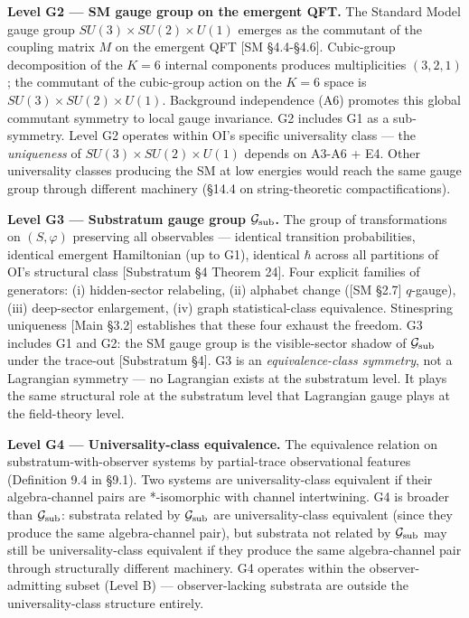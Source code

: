 \documentclass[
]{article}
\begin{document}
\textbf{Level G2 --- SM gauge group on the emergent QFT.} The Standard
Model gauge group \(SU(3) \times SU(2) \times U(1)\) emerges as the
commutant of the coupling matrix \(M\) on the emergent QFT {[}SM
§4.4-§4.6{]}. Cubic-group decomposition of the \(K=6\) internal
components produces multiplicities \((3, 2, 1)\); the commutant of the
cubic-group action on the \(K=6\) space is
\(SU(3) \times SU(2) \times U(1)\). Background independence (A6)
promotes this global commutant symmetry to local gauge invariance. G2
includes G1 as a sub-symmetry. Level G2 operates within OI's specific
universality class --- the \emph{uniqueness} of
\(SU(3) \times SU(2) \times U(1)\) depends on A3-A6 + E4. Other
universality classes producing the SM at low energies would reach the
same gauge group through different machinery (§14.4 on string-theoretic
compactifications).

\textbf{Level G3 --- Substratum gauge group \(\mathcal{G}_{\rm sub}\).}
The group of transformations on \((S, \varphi)\) preserving all
observables --- identical transition probabilities, identical emergent
Hamiltonian (up to G1), identical \(\hbar\) across all partitions of
OI's structural class {[}Substratum §4 Theorem 24{]}. Four explicit
families of generators: (i) hidden-sector relabeling, (ii) alphabet
change ({[}SM §2.7{]} \(q\)-gauge), (iii) deep-sector enlargement, (iv)
graph statistical-class equivalence. Stinespring uniqueness {[}Main
§3.2{]} establishes that these four exhaust the freedom. G3 includes G1
and G2: the SM gauge group is the visible-sector shadow of
\(\mathcal{G}_{\rm sub}\) under the trace-out {[}Substratum §4{]}. G3 is
an \emph{equivalence-class symmetry}, not a Lagrangian symmetry --- no
Lagrangian exists at the substratum level. It plays the same structural
role at the substratum level that Lagrangian gauge plays at the
field-theory level.

\textbf{Level G4 --- Universality-class equivalence.} The equivalence
relation on substratum-with-observer systems by partial-trace
observational features (Definition 9.4 in §9.1). Two systems are
universality-class equivalent if their algebra-channel pairs are
*-isomorphic with channel intertwining. G4 is broader than
\(\mathcal{G}_{\rm sub}\): substrata related by
\(\mathcal{G}_{\rm sub}\) are universality-class equivalent (since they
produce the same algebra-channel pair), but substrata not related by
\(\mathcal{G}_{\rm sub}\) may still be universality-class equivalent if
they produce the same algebra-channel pair through structurally
different machinery. G4 operates within the observer-admitting subset
(Level B) --- observer-lacking substrata are outside the
universality-class structure entirely.
\end{document}

